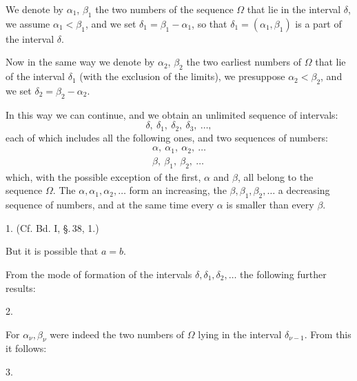 
We denote by $\alpha_1$, $\beta_1$ the two  numbers of the sequence $\Omega$ that lie in the interval $\delta$, we assume $\alpha_1 < \beta_1$, and we set $\delta_1 = \beta_1 - \alpha_1$, so that $\delta_1 = (\alpha_1, \beta_1)$ is a part of the interval $\delta$.

Now in the same way we denote by $\alpha_2$, $\beta_2$ the two earliest numbers of $\Omega$ that lie  of the interval $\delta_1$ (with the exclusion of the limits), we presuppose $\alpha_2 < \beta_2$, and we set $\delta_2 = \beta_2 - \alpha_2$.

In this way we can continue, and we obtain an unlimited sequence of intervals:
\[
\delta,\ \delta_1,\ \delta_2,\ \delta_3,\ \dots,
\]
each of which includes all the following ones, and two sequences of numbers:
\[
\begin{gathered}
\alpha,\ \alpha_1,\ \alpha_2,\ \dots \\
\beta,\ \beta_1,\ \beta_2,\ \dots
\end{gathered}
\]
which, with the possible exception of the first, $\alpha$ and $\beta$, all belong to the sequence $\Omega$. The $\alpha, \alpha_1, \alpha_2, \dots$ form an increasing, the $\beta, \beta_1, \beta_2, \dots$ a decreasing sequence of numbers, and at the same time every $\alpha$ is smaller than every $\beta$.

1.  (Cf. Bd. I, \S.\,38, 1.)

But it is possible that $a = b$.

From the mode of formation of the intervals $\delta, \delta_1, \delta_2, \dots$ the following further results:

2. 

For $\alpha_\nu, \beta_\nu$ were indeed the two  numbers of $\Omega$ lying in the interval $\delta_{\nu-1}$. From this it follows:

3. 
